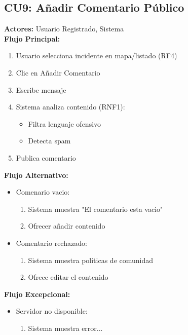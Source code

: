 \begin{multicols}{2}
\subsection*{CU9: Añadir Comentario Público}
\textbf{Actores:} Usuario Registrado, Sistema\\
\textbf{Flujo Principal:}
\begin{enumerate}
    \item Usuario selecciona incidente en mapa/listado (RF4)
    \item Clic en Añadir Comentario
    \item Escribe mensaje
    \item Sistema analiza contenido (RNF1):
    \begin{itemize}
        \item Filtra lenguaje ofensivo
        \item Detecta spam
    \end{itemize}
    \item Publica comentario
\end{enumerate}

\textbf{Flujo Alternativo:}
\begin{itemize}
    \item Comenario vacio:
    \begin{enumerate}
        \item Sistema muestra "El comentario esta vacio"
        \item Ofrecer añadir contenido
    \end{enumerate}
    \item Comentario rechazado:
    \begin{enumerate}
        \item Sistema muestra políticas de comunidad
        \item Ofrece editar el contenido
    \end{enumerate}
\end{itemize}

\textbf{Flujo Excepcional:}
\begin{itemize}
    \item Servidor no disponible:
    \begin{enumerate}
        \item Sistema muestra error...
    \end{enumerate}
\end{itemize}


\end{multicols}
